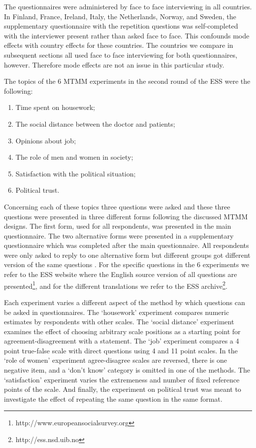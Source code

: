 \documentclass[a4paper,12pt]{article}
\begin{document}
The questionnaires were administered by face to face interviewing in all countries. In Finland, France, Ireland, Italy, the Netherlands, Norway, and Sweden, the supplementary questionnaire with the repetition questions was self-completed with the interviewer present rather than asked face to face. This confounds mode effects with country effects for these countries. The countries we compare in subsequent sections all used face to face interviewing for both questionnaires, however. Therefore mode effects are not an issue in this particular study.

The topics of the 6 MTMM experiments in the second round of the ESS were the following:
\begin{enumerate}
\item Time spent on housework;
\item The social distance between the doctor and patients;
\item Opinions about job;
\item The role of men and women in society;
\item Satisfaction with the political situation;
\item Political trust.
\end{enumerate}
Concerning each of these topics three questions were asked and these three questions were presented in three different forms following the discussed MTMM designs. The first form,  used for all respondents, was presented in the main questionnaire. The two alternative forms were presented in a supplementary questionnaire which was completed after the main questionnaire. All respondents were only asked to reply to one alternative form but different groups got different version of the same questions \citep*{saris_new_2004}. For the specific questions in the 6 experiments we refer to the ESS website where the English source version of all questions are presented\footnote{http://www.europeansocialsurvey.org}, and for the different translations we refer to the ESS archive\footnote{http://ess.nsd.uib.no}.

	Each experiment varies a different aspect of the method by which questions can be asked in questionnaires. The `housework' experiment compares numeric estimates by respondents with other scales. The `social distance' experiment examines the effect of choosing arbitrary scale positions as a starting point for agreement-disagreement with a statement. The `job' experiment compares a 4 point true-false scale with direct questions using 4 and 11 point scales. In the `role of women' experiment agree-disagree scales are reversed, there is one negative item, and a `don't know' category is omitted in one of the methods.  The `satisfaction' experiment varies the extremeness and number of fixed reference points of the scale. And finally, the experiment on political trust was meant to investigate the effect of repeating the same question in the same format.
\end{document}
